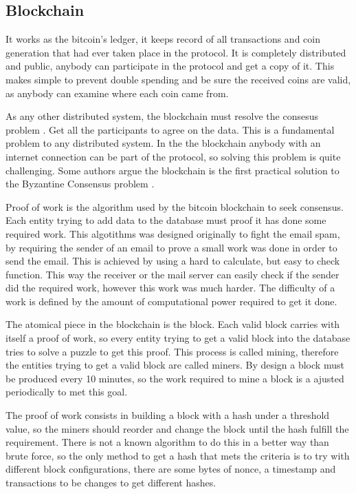 \subsection{Blockchain}
It works as the bitcoin's ledger, it keeps record of all
  transactions and coin generation that had ever taken place in the protocol.
It is completely distributed and public, anybody can participate in the
  protocol and get a copy of it. This makes simple to prevent double spending
  and be sure the received coins are valid, as anybody can examine where each
  coin came from.

As any other distributed system, the blockchain must resolve the consesus
  problem \cite{fischer1983consensus}. Get all the participants to agree on
  the data. This is a fundamental problem to any distributed system. In the
  the blockchain anybody with an internet connection can be part of the
  protocol, so solving this problem is quite challenging. Some authors argue
  the blockchain is the first practical solution to the Byzantine Consensus
  problem \cite{miller2014anonymous} \cite{sun2014solving}.

Proof of work is the algorithm used by the bitcoin blockchain to seek
  consensus. Each entity trying to add data to the database must proof it
  has done some required work. This algotithms was designed originally to
  fight the email spam, by requiring the sender of an email to prove a small
  work was done in order to send the email\cite{dwork1992pricing}. This is
  achieved by using a hard to calculate, but easy to check function. This
  way the receiver or the mail server can easily check if the sender did
  the required work, however this work was much harder. The difficulty of
  a work is defined by the amount of computational power required to get
  it done.

The atomical piece in the blockchain is the block. Each valid block carries with
  itself a proof of work, so every entity trying to get a valid block into the
  database tries to solve a puzzle to get this proof.
This process is called mining, therefore the entities trying to get a valid
  block are called miners.
By design a block must be produced every 10 minutes, so the work required to
  mine a block is a ajusted periodically to met this goal.

The proof of work consists in building a block with a hash under a threshold
  value, so the miners should reorder and change the block until the hash
  fulfill the requirement. There is not a known algorithm to do this in a
  better way than brute force, so the only method to get a hash that mets the
  criteria is to try with different block configurations, there are some bytes
  of nonce, a timestamp and transactions to be changes to get different hashes.

